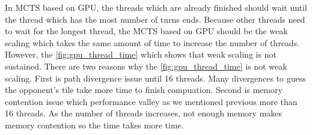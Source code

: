In MCTS based on GPU, the threads which are already finished should wait until the thread which has the most number of turns ends. 
Because other threads need to wait for the longest thread, the MCTS based on GPU should be the weak scaling which takes the same amount of time to increase the number of threads.
However, the \cref{fig:gpu_thread_time} which shows that weak scaling is not sustained. 
There are two reasons why the \cref{fig:gpu_thread_time} is not weak scaling. 
First is path divergence issue until 16 threads. 
Many divergences to guess the opponent's tile take more time to finish compuation.   
Second is memory contention issue which performance valley as we mentioned previous more than 16 threads.
As the number of threads increases, not enough memory makes memory contention so the time takes more time.
